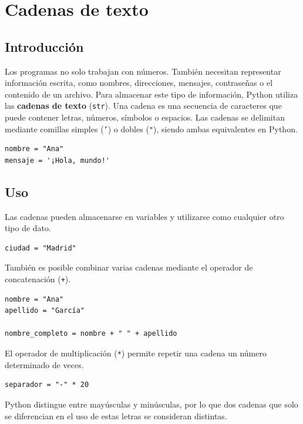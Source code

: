 \documentclass[11pt,a5paper,twoside]{book}
\begin{document}
\newpage

\section{Cadenas de texto}
\subsection{Introducción}
Los programas no solo trabajan con números. También necesitan representar información escrita, como nombres, direcciones, mensajes, contraseñas o el contenido de un archivo.
Para almacenar este tipo de información, Python utiliza las \textbf{cadenas de texto} ({\scriptsize \texttt{str}}). Una cadena es una secuencia de caracteres que puede contener letras, números, símbolos o espacios.
Las cadenas se delimitan mediante comillas simples ({\scriptsize \texttt{'}}) o dobles ({\scriptsize \texttt{"}}), siendo ambas equivalentes en Python.


\begin{tcolorbox}
\scriptsize
 \begin{verbatim}
nombre = "Ana"
mensaje = '¡Hola, mundo!'
\end{verbatim}
\end{tcolorbox}
\subsection{Uso}
Las cadenas pueden almacenarse en variables y utilizarse como cualquier otro tipo de dato.


\begin{tcolorbox}
\scriptsize
 \begin{verbatim}
ciudad = "Madrid"
\end{verbatim}
\end{tcolorbox}
También es posible combinar varias cadenas mediante el operador de concatenación ({\scriptsize \texttt{+}}).


\begin{tcolorbox}
\scriptsize
 \begin{verbatim}
nombre = "Ana"
apellido = "García"

nombre_completo = nombre + " " + apellido
\end{verbatim}
\end{tcolorbox}
El operador de multiplicación ({\scriptsize \texttt{*}}) permite repetir una cadena un número determinado de veces.


\begin{tcolorbox}
\scriptsize
 \begin{verbatim}
separador = "-" * 20
\end{verbatim}
\end{tcolorbox}
Python distingue entre mayúsculas y minúsculas, por lo que dos cadenas que solo se diferencian en el uso de estas letras se consideran distintas.
\end{document}
